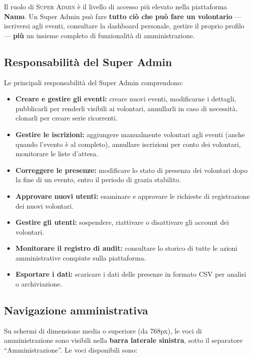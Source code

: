 \documentclass[a4paper,11pt,oneside]{book}
\newcommand{\namo}{\textbf{Namo}}
\newcommand{\ruolo}[1]{\textsc{#1}}
\begin{document}
Il ruolo di \ruolo{Super Admin} \`e il livello di accesso pi\`u elevato nella piattaforma \namo{}. Un Super Admin pu\`o fare \textbf{tutto ci\`o che pu\`o fare un volontario} --- iscriversi agli eventi, consultare la dashboard personale, gestire il proprio profilo --- \textbf{pi\`u} un insieme completo di funzionalit\`a di amministrazione.

\subsection{Responsabilit\`a del Super Admin}

Le principali responsabilit\`a del Super Admin comprendono:

\begin{itemize}[leftmargin=1.5em]
  \item \textbf{Creare e gestire gli eventi:} creare nuovi eventi, modificarne i dettagli, pubblicarli per renderli visibili ai volontari, annullarli in caso di necessit\`a, clonarli per creare serie ricorrenti.
  \item \textbf{Gestire le iscrizioni:} aggiungere manualmente volontari agli eventi (anche quando l'evento \`e al completo), annullare iscrizioni per conto dei volontari, monitorare le liste d'attesa.
  \item \textbf{Correggere le presenze:} modificare lo stato di presenza dei volontari dopo la fine di un evento, entro il periodo di grazia stabilito.
  \item \textbf{Approvare nuovi utenti:} esaminare e approvare le richieste di registrazione dei nuovi volontari.
  \item \textbf{Gestire gli utenti:} sospendere, riattivare o disattivare gli account dei volontari.
  \item \textbf{Monitorare il registro di audit:} consultare lo storico di tutte le azioni amministrative compiute sulla piattaforma.
  \item \textbf{Esportare i dati:} scaricare i dati delle presenze in formato CSV per analisi o archiviazione.
\end{itemize}

\subsection{Navigazione amministrativa}

Su schermi di dimensione media o superiore (da 768px), le voci di amministrazione sono visibili nella \textbf{barra laterale sinistra}, sotto il separatore ``Amministrazione''. Le voci disponibili sono:
\end{document}
